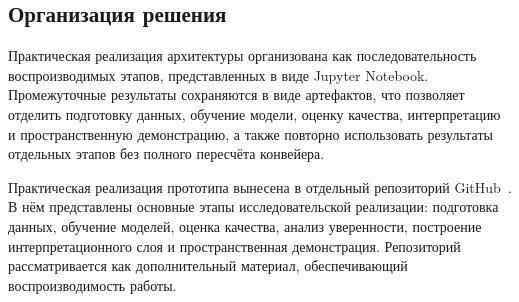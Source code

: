\subsection{Организация решения}

Практическая реализация архитектуры организована как последовательность воспроизводимых этапов,
представленных в виде Jupyter Notebook. Промежуточные результаты сохраняются в виде артефактов, что позволяет
отделить подготовку данных, обучение модели, оценку качества, интерпретацию и пространственную демонстрацию,
а также повторно использовать результаты отдельных этапов без полного пересчёта конвейера.

Практическая реализация прототипа вынесена в отдельный репозиторий GitHub~\cite{crop_rotation_repo}.
В нём представлены основные этапы исследовательской реализации: подготовка данных, обучение моделей, оценка
качества, анализ уверенности, построение интерпретационного слоя и пространственная демонстрация.
Репозиторий рассматривается как дополнительный материал, обеспечивающий воспроизводимость работы.